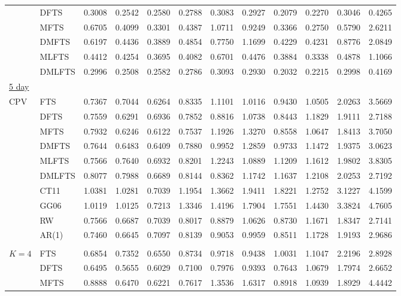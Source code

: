 \documentclass[12pt,a4paper]{article}
\begin{document}
\begin{center}
\begin{small}
\begin{longtable}{@{}llrrrrrrrrrr@{}}
  & DFTS & 0.3008 & 0.2542 & 0.2580 & 0.2788 & 0.3083 & 0.2927 & 0.2079 & 0.2270 & 0.3046 & 0.4265 \\ 
  & MFTS & 0.6705 & 0.4099 & 0.3301 & 0.4387 & 1.0711 & 0.9249 & 0.3366 & 0.2750 & 0.5790 & 2.6211 \\ 
  & DMFTS & 0.6197 & 0.4436 & 0.3889 & 0.4854 & 0.7750 & 1.1699 & 0.4229 & 0.4231 & 0.8776 & 2.0849 \\ 
  & MLFTS & 0.4412 & 0.4254 & 0.3695 & 0.4082 & 0.6701 & 0.4476 & 0.3884 & 0.3338 & 0.4878 & 1.1066 \\ 
  & DMLFTS & 0.2996 & 0.2508 & 0.2582 & 0.2786 & 0.3093 & 0.2930 & 0.2032 & 0.2215 & 0.2998 & 0.4169 \\ 
\underline{5 day} \\
 CPV & FTS & 0.7367 & 0.7044 & 0.6264 & 0.8335 & 1.1101 & 1.0116 & 0.9430 & 1.0505 & 2.0263 & 3.5669 \\ 
 & DFTS & 0.7559 & 0.6291 & 0.6936 & 0.7852 & 0.8816 & 1.0738 & 0.8443 & 1.1829 & 1.9111 & 2.7188 \\ 
 & MFTS & 0.7932 & 0.6246 & 0.6122 & 0.7537 & 1.1926 & 1.3270 & 0.8558 & 1.0647 & 1.8413 & 3.7050 \\ 
 & DMFTS & 0.7644 & 0.6483 & 0.6409 & 0.7880 & 0.9952 & 1.2859 & 0.9733 & 1.1472 & 1.9375 & 3.0623 \\ 
 & MLFTS & 0.7566 & 0.7640 & 0.6932 & 0.8201 & 1.2243 & 1.0889 & 1.1209 & 1.1612 & 1.9802 & 3.8305 \\ 
 & DMLFTS & 0.8077 & 0.7988 & 0.6689 & 0.8144 & 0.8362 & 1.1742 & 1.1637 & 1.2108 & 2.0253 & 2.7192 \\ 
  & CT11 & 1.0381 & 1.0281 & 0.7039 & 1.1954 & 1.3662 & 1.9411 & 1.8221 & 1.2752 & 3.1227 & 4.1599 \\ 
  & GG06 & 1.0119 & 1.0125 & 0.7213 & 1.3346 & 1.4196 & 1.7904 & 1.7551 & 1.4430 & 3.3824 & 4.7605 \\ 
  & RW & 0.7566 & 0.6687 & 0.7039 & 0.8017 & 0.8879 & 1.0626 & 0.8730 & 1.1671 & 1.8347 & 2.7141 \\ 
  & AR(1) & 0.7460 & 0.6645 & 0.7097 & 0.8139 & 0.9053 & 0.9959 & 0.8511 & 1.1728 & 1.9193 & 2.9686 \\ 
\\
$K=4$ & FTS & 0.6854 & 0.7352 & 0.6550 & 0.8734 & 0.9718 & 0.9438 & 1.0031 & 1.1047 & 2.2196 & 2.8928 \\ 
  & DFTS & 0.6495 & 0.5655 & 0.6029 & 0.7100 & 0.7976 & 0.9393 & 0.7643 & 1.0679 & 1.7974 & 2.6652 \\ 
  & MFTS & 0.8888 & 0.6470 & 0.6221 & 0.7617 & 1.3536 & 1.6317 & 0.8918 & 1.0939 & 1.8929 & 4.4442 \\ 

\end{longtable}
\end{small}
\end{center}
\end{document}
